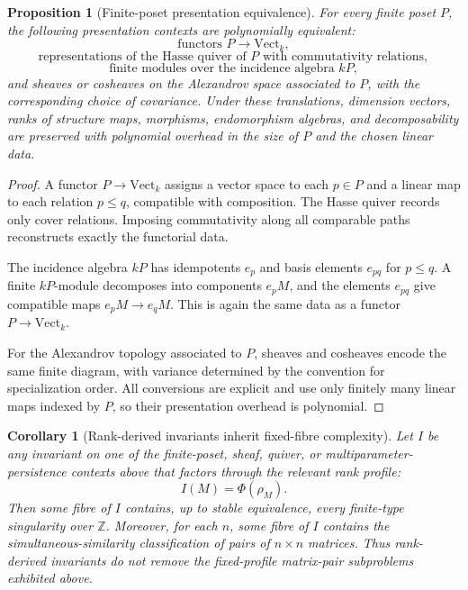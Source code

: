 \documentclass[11pt]{article}
\newtheorem{proposition}[theorem]{Proposition}
\newtheorem{corollary}[theorem]{Corollary}
\begin{document}
\begin{proposition}[Finite-poset presentation equivalence]
For every finite poset \(P\), the following presentation contexts are polynomially equivalent:
\[
\text{functors }P\to\mathrm{Vect}_k,
\]
\[
\text{representations of the Hasse quiver of }P\text{ with commutativity relations},
\]
\[
\text{finite modules over the incidence algebra }kP,
\]
and sheaves or cosheaves on the Alexandrov space associated to \(P\), with the corresponding choice of covariance. Under these translations, dimension vectors, ranks of structure maps, morphisms, endomorphism algebras, and decomposability are preserved with polynomial overhead in the size of \(P\) and the chosen linear data.
\end{proposition}

\begin{proof}
A functor \(P\to\mathrm{Vect}_k\) assigns a vector space to each \(p\in P\) and a linear map to each relation \(p\leq q\), compatible with composition. The Hasse quiver records only cover relations. Imposing commutativity along all comparable paths reconstructs exactly the functorial data.

The incidence algebra \(kP\) has idempotents \(e_p\) and basis elements \(e_{pq}\) for \(p\leq q\). A finite \(kP\)-module decomposes into components \(e_pM\), and the elements \(e_{pq}\) give compatible maps \(e_pM\to e_qM\). This is again the same data as a functor \(P\to\mathrm{Vect}_k\).

For the Alexandrov topology associated to \(P\), sheaves and cosheaves encode the same finite diagram, with variance determined by the convention for specialization order. All conversions are explicit and use only finitely many linear maps indexed by \(P\), so their presentation overhead is polynomial.
\end{proof}

\begin{corollary}[Rank-derived invariants inherit fixed-fibre complexity]
Let \(I\) be any invariant on one of the finite-poset, sheaf, quiver, or multiparameter-persistence contexts above that factors through the relevant rank profile:
\[
I(M)=\Phi(\rho_M).
\]
Then some fibre of \(I\) contains, up to stable equivalence, every finite-type singularity over \(\mathbb Z\). Moreover, for each \(n\), some fibre of \(I\) contains the simultaneous-similarity classification of pairs of \(n\times n\) matrices. Thus rank-derived invariants do not remove the fixed-profile matrix-pair subproblems exhibited above.
\end{corollary}
\end{document}
